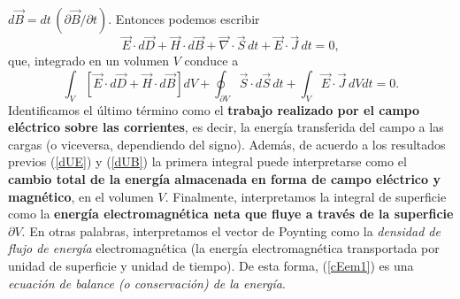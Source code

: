 $d\vec{B}=dt\,({\partial \vec{B}}/{\partial t})$. Entonces podemos escribir
\begin{equation}
\vec{E}\cdot
d\vec{D}+\vec{H}\cdot d\vec{B}+\vec\nabla\cdot\vec{S}\,dt+\vec{E}\cdot\vec{J}\,
dt=0,
\end{equation}
que, integrado en un volumen $V$ conduce a 
\begin{equation}
\boxed{\int_V\left[\vec{E}\cdot d\vec{D}+\vec{H}\cdot
d\vec{B}\right]dV+\oint_{\partial V}
\vec{S}\cdot d\vec{S}\,dt+\int_V\vec{E}\cdot\vec{J}\,
dVdt=0.} \label{cEem1}
\end{equation}
Identificamos el último término como el \textbf{trabajo realizado por el campo eléctrico sobre las corrientes}, es decir, la energía transferida del campo a las cargas (o viceversa, dependiendo del signo). Además, de acuerdo a los resultados previos (\ref{dUE}) y (\ref{dUB}) la primera integral puede interpretarse como el \textbf{cambio total de la energía almacenada en forma de campo eléctrico y magnético}, en el volumen $V$. Finalmente, interpretamos la integral de superficie como la \textbf{energía electromagnética neta que fluye a través de la superficie $\partial V$}. En otras palabras, interpretamos el vector de Poynting como la \textit{densidad de flujo de energía} electromagnética (la energía electromagnética transportada por unidad de superficie y unidad de tiempo). De esta forma, (\ref{cEem1}) es una \textit{ecuación de balance (o conservación) de la energía}.

